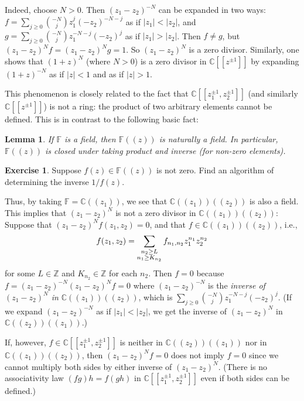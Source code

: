 \documentclass[12pt,a4paper,notitlepage]{article}
\theoremstyle{definition}
\newtheorem{exe}[df]{Exercise}
\theoremstyle{plain}
\newtheorem{lm}[df]{Lemma}
\newcommand{\mbb}{\mathbb}
\newcommand{\Cbb}{\mathbb C}
\newcommand{\Zbb}{\mathbb Z}
\numberwithin{equation}{section}
\begin{document}
Indeed, choose $N>0$. Then $(z_1-z_2)^{-N}$ can be expanded in two ways: $f=\sum_{j\geq 0}{-N\choose j}z_1^j(-z_2)^{-N-j}$ as if $|z_1|<|z_2|$, and $g=\sum_{j\geq 0}{-N\choose j}z_1^{-N-j}(-z_2)^j$ as if $|z_1|>|z_2|$. Then $f\neq g$, but $(z_1-z_2)^Nf=(z_1-z_2)^Ng=1$. So $(z_1-z_2)^N$ is a zero divisor. Similarly, one shows that $(1+z)^N$ (where $N>0$) is a zero divisor in $\Cbb[[z^{\pm1}]]$ by expanding $(1+z)^{-N}$ as if $|z|<1$ and as if $|z|>1$.


This phenomenon is closely related to the fact that $\Cbb[[z_1^{\pm1},z_2^{\pm1}]]$ (and similarly $\Cbb[[z^{\pm1}]]$) is not a ring: the product of two arbitrary elements cannot be defined. This is in contrast to the following basic fact:
\begin{lm}
If $\mbb F$ is a field, then $\mbb F((z))$ is naturally a field. In particular, $\mbb F((z))$ is closed under taking product and inverse (for non-zero elements).
\end{lm}

\begin{exe}
Suppose $f(z)\in\mbb F((z))$ is not zero. Find an algorithm of determining the inverse $1/f(z)$.
\end{exe}

Thus, by taking $\mbb F=\Cbb((z_1))$, we see that $\Cbb((z_1))((z_2))$ is also a field. This implies that $(z_1-z_2)^N$ is not a zero divisor in $\Cbb((z_1))((z_2))$: Suppose that $(z_1-z_2)^Nf(z_1,z_2)=0$,  and that $f\in\Cbb((z_1))((z_2))$, i.e., 
\begin{align*}
f(z_1,z_2)=\sum_{\begin{subarray}{c}
	n_2\geq L\\	
n_1\geq K_{n_2} 
\end{subarray}}f_{n_1,n_2}z_1^{n_1}z_2^{n_2}
\end{align*}
for some $L\in\Zbb$ and $K_{n_2}\in\Zbb$ for each $n_2$. Then $f=0$ because $f=(z_1-z_2)^{-N}(z_1-z_2)^Nf=0$ where $(z_1-z_2)^{-N}$ is the \emph{inverse of $(z_1-z_2)^N$ in $\Cbb((z_1))((z_2))$}, which is  $\sum_{j\geq0}{-N\choose j}z_1^{-N-j}(-z_2)^j$. (If we expand $(z_1-z_2)^{-N}$ as if $|z_1|<|z_2|$, we get the inverse of $(z_1-z_2)^N$ in $\Cbb((z_2))((z_1))$.)

If, however, $f\in\Cbb[[z_1^{\pm1},z_2^{\pm1}]]$ is neither in $\Cbb((z_2))((z_1))$ nor in $\Cbb((z_1))((z_2))$, then $(z_1-z_2)^Nf=0$ does not imply $f=0$ since we cannot multiply both sides by either inverse of $(z_1-z_2)^N$. (There is no associativity law $(fg)h=f(gh)$ in $\Cbb[[z_1^{\pm1},z_2^{\pm1}]]$ even if both sides can be defined.)
\end{document}
